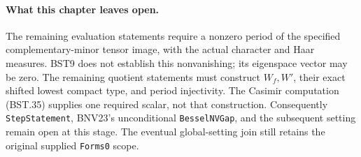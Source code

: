 
\paragraph{What this chapter leaves open.}
The remaining evaluation statements require a nonzero period of the
specified complementary-minor tensor image, with the actual
character and Haar measures.  BST9 does not establish this
nonvanishing; its eigenspace vector may be zero.
The remaining quotient statements must construct $W_f,W'$,
their exact shifted lowest compact type, and period injectivity.
The Casimir computation (BST.35) supplies one required scalar, not
that construction.
Consequently \texttt{StepStatement}, BNV23's unconditional
\texttt{BesselNVGap}, and the subsequent setting remain open at this
stage.  The eventual global-setting join still retains the original
supplied \texttt{Forms0} scope.
